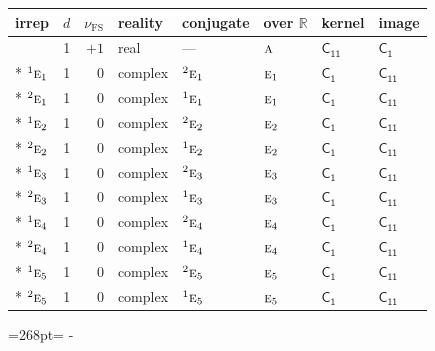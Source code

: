 \documentclass[10pt,a4paper]{article}
\newcommand{\needspace}[1]{\par\penalty-100\begingroup\dimen0=#1\relax\dimen2=\pagegoal
  \advance\dimen2-\pagetotal\ifdim\dimen0>\dimen2\relax\ifdim\dimen2>0pt\vfil\break\fi\fi
  \endgroup}
\numberwithin{equation}{section}
\newcommand{\grp}[1]{\mathsf{#1}}
\newcommand{\irr}[1]{\text{\normalfont\scshape #1}}
\newcommand{\conjpair}[1]{{}^{#1}}
\newcommand{\detbox}[1]{{\setlength{\fboxsep}{1pt}\fbox{#1}}}
\newcommand{\fsind}{\nu_{\mathrm{FS}}}
\begin{document}
{\small\renewcommand{\arraystretch}{1.25}\setlength{\tabcolsep}{4pt}\begin{longtable}{@{}lrrlllll@{}}\toprule
irrep & $d$ & $\fsind$ & reality & conjugate & over $\mathbb{R}$ & kernel & image\\\midrule\endhead
\bottomrule\endfoot\endlastfoot
\detbox{$\irr{a}$} & 1 & $+1$ & real & --- & $\irr{a}$ & \href{C11.pdf}{$\grp{C_{11}}$} & \href{../../../rotation/data/pdf/C1.pdf}{$\grp{C_{1}}$}\\*
$\conjpair{1}\irr{e}_{1}$ & 1 & $0$ & complex & $\conjpair{2}\irr{e}_{1}$ & $\irr{e}_{1}$ & \href{C1.pdf}{$\grp{C_{1}}$} & \href{../../../rotation/data/pdf/C11.pdf}{$\grp{C_{11}}$}\\*
$\conjpair{2}\irr{e}_{1}$ & 1 & $0$ & complex & $\conjpair{1}\irr{e}_{1}$ & $\irr{e}_{1}$ & \href{C1.pdf}{$\grp{C_{1}}$} & \href{../../../rotation/data/pdf/C11.pdf}{$\grp{C_{11}}$}\\*
$\conjpair{1}\irr{e}_{2}$ & 1 & $0$ & complex & $\conjpair{2}\irr{e}_{2}$ & $\irr{e}_{2}$ & \href{C1.pdf}{$\grp{C_{1}}$} & \href{../../../rotation/data/pdf/C11.pdf}{$\grp{C_{11}}$}\\*
$\conjpair{2}\irr{e}_{2}$ & 1 & $0$ & complex & $\conjpair{1}\irr{e}_{2}$ & $\irr{e}_{2}$ & \href{C1.pdf}{$\grp{C_{1}}$} & \href{../../../rotation/data/pdf/C11.pdf}{$\grp{C_{11}}$}\\*
$\conjpair{1}\irr{e}_{3}$ & 1 & $0$ & complex & $\conjpair{2}\irr{e}_{3}$ & $\irr{e}_{3}$ & \href{C1.pdf}{$\grp{C_{1}}$} & \href{../../../rotation/data/pdf/C11.pdf}{$\grp{C_{11}}$}\\*
$\conjpair{2}\irr{e}_{3}$ & 1 & $0$ & complex & $\conjpair{1}\irr{e}_{3}$ & $\irr{e}_{3}$ & \href{C1.pdf}{$\grp{C_{1}}$} & \href{../../../rotation/data/pdf/C11.pdf}{$\grp{C_{11}}$}\\*
$\conjpair{1}\irr{e}_{4}$ & 1 & $0$ & complex & $\conjpair{2}\irr{e}_{4}$ & $\irr{e}_{4}$ & \href{C1.pdf}{$\grp{C_{1}}$} & \href{../../../rotation/data/pdf/C11.pdf}{$\grp{C_{11}}$}\\*
$\conjpair{2}\irr{e}_{4}$ & 1 & $0$ & complex & $\conjpair{1}\irr{e}_{4}$ & $\irr{e}_{4}$ & \href{C1.pdf}{$\grp{C_{1}}$} & \href{../../../rotation/data/pdf/C11.pdf}{$\grp{C_{11}}$}\\*
$\conjpair{1}\irr{e}_{5}$ & 1 & $0$ & complex & $\conjpair{2}\irr{e}_{5}$ & $\irr{e}_{5}$ & \href{C1.pdf}{$\grp{C_{1}}$} & \href{../../../rotation/data/pdf/C11.pdf}{$\grp{C_{11}}$}\\*
$\conjpair{2}\irr{e}_{5}$ & 1 & $0$ & complex & $\conjpair{1}\irr{e}_{5}$ & $\irr{e}_{5}$ & \href{C1.pdf}{$\grp{C_{1}}$} & \href{../../../rotation/data/pdf/C11.pdf}{$\grp{C_{11}}$}\\
\bottomrule\end{longtable}}
\needspace{268pt}
\end{document}
